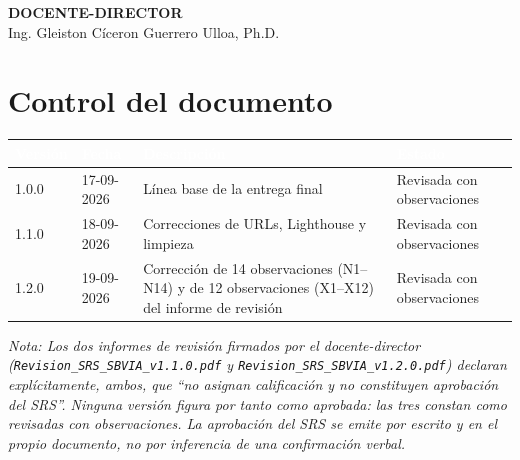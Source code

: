 \documentclass[11pt,a4paper]{article}
\begin{document}
\begin{titlepage}
    {\Large \textbf{DOCENTE-DIRECTOR}}\\[0.2cm]
    {\large Ing. Gleiston Cíceron Guerrero Ulloa, Ph.D.}\\[0.5cm]

    
\end{titlepage}

\newpage
\tableofcontents
\newpage

\section*{Control del documento}

\begin{table}[h]
    \centering
    \renewcommand{\arraystretch}{1.5}
    \begin{tabularx}{\textwidth}{@{}|l|l|X|l|@{}}
        \hline
        \rowcolor{uteqblue}
        \textcolor{white}{\textbf{Versión}} & \textcolor{white}{\textbf{Fecha}} & \textcolor{white}{\textbf{Descripción}} & \textcolor{white}{\textbf{Estado}} \\ \hline
        1.0.0 & 17-09-2026 & Línea base de la entrega final & Revisada con observaciones \\ \hline
        1.1.0 & 18-09-2026 & Correcciones de URLs, Lighthouse y limpieza & Revisada con observaciones \\ \hline
        1.2.0 & 19-09-2026 & Corrección de 14 observaciones (N1–N14) y de 12 observaciones (X1–X12) del informe de revisión & Revisada con observaciones \\ \hline
    \end{tabularx}
\end{table}

\textit{Nota: Los dos informes de revisión firmados por el docente-director
(\texttt{Revision\_SRS\_SBVIA\_v1.1.0.pdf} y \texttt{Revision\_SRS\_SBVIA\_v1.2.0.pdf}) declaran
explícitamente, ambos, que ``no asignan calificación y no constituyen aprobación del SRS''.
Ninguna versión figura por tanto como aprobada: las tres constan como revisadas con observaciones.
La aprobación del SRS se emite por escrito y en el propio documento, no por inferencia de una
confirmación verbal.}
\end{document}
